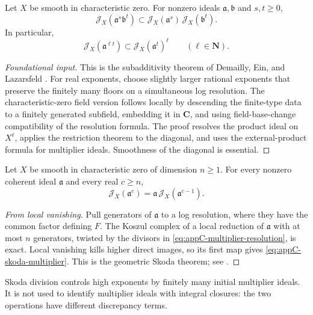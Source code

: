 \begin{theorem}\label{thm:appC-multiplier-subadditivity}
Let \(X\) be smooth in characteristic zero.  For nonzero ideals
\(\mathfrak a,\mathfrak b\) and \(s,t\geq0\),
\[
 \mathcal J_X(\mathfrak a^s\mathfrak b^t)
 \subset
 \mathcal J_X(\mathfrak a^s)\,
 \mathcal J_X(\mathfrak b^t).
\tag{C.10}\label{eq:appC-multiplier-subadditivity}
\]
In particular,
\[
 \mathcal J_X(\mathfrak a^{\ell t})
 \subset\mathcal J_X(\mathfrak a^t)^\ell
\qquad(\ell\in\mathbf N).
\tag{C.11}\label{eq:appC-multiplier-powers}
\]
\end{theorem}

\begin{proof}[Foundational input]
This is the subadditivity theorem of Demailly, Ein, and Lazarsfeld
\cite[Theorem~2.3 and Variant~2.5]{DEL00}.  For real exponents, choose
slightly larger rational exponents that preserve the finitely many floors
on a simultaneous log resolution.  The characteristic-zero field version
follows locally by descending the finite-type data to a finitely generated
subfield, embedding it in \(\mathbf C\), and using field-base-change
compatibility of the resolution formula.  The proof resolves the product ideal on
\(X^\ell\), applies the
restriction theorem to the diagonal, and uses the external-product formula
for multiplier ideals.  Smoothness of the diagonal is essential.
\end{proof}

\begin{theorem}\label{thm:appC-skoda-multiplier}
Let \(X\) be smooth in characteristic zero of dimension \(n\geq1\).
For every nonzero coherent ideal
\(\mathfrak a\) and every real \(c\geq n\),
\[
 \mathcal J_X(\mathfrak a^c)
 =\mathfrak a\,
   \mathcal J_X(\mathfrak a^{c-1}).
\tag{C.12}\label{eq:appC-skoda-multiplier}
\]
\end{theorem}

\begin{proof}[From local vanishing]
Pull generators of \(\mathfrak a\) to a log resolution, where they have
the common factor defining \(F\).  The Koszul complex of a local reduction
of \(\mathfrak a\) with at most \(n\) generators, twisted by the divisors in
\eqref{eq:appC-multiplier-resolution}, is exact.  Local vanishing kills
higher direct images, so its first map gives
\eqref{eq:appC-skoda-multiplier}.  This is the geometric Skoda theorem;
see \cite[Section~9.6]{PAG2}.
\end{proof}

\begin{remark}
\label{rem:appC-skoda-versus-integral-closure}
Skoda division controls high exponents by finitely many initial multiplier
ideals.  It is not used to identify multiplier ideals with integral
closures: the two operations have different discrepancy terms.
\end{remark}

